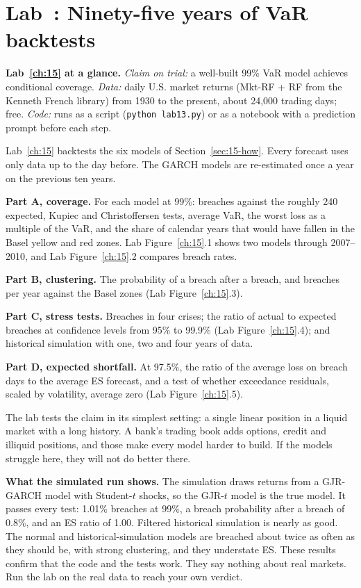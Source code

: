\section{Lab~\thechapter: Ninety-five years of VaR backtests}
\label{sec:15-lab}

\begin{callout}
\textbf{Lab~\ref{ch:15} at a glance.} \emph{Claim on trial:} a well-built 99\% VaR model achieves conditional coverage. \emph{Data:} daily U.S. market returns (Mkt-RF + RF from the Kenneth French library) from 1930 to the present, about 24,000 trading days; free. \emph{Code:} runs as a script (\texttt{python lab13.py}) or as a notebook with a prediction prompt before each step.
\end{callout}

Lab~\ref{ch:15} backtests the six models of Section~\ref{sec:15-how}. Every forecast uses only data up to the day before. The GARCH models are re-estimated once a year on the previous ten years.

\textbf{Part A, coverage.} For each model at 99\%: breaches against the roughly 240 expected, Kupiec and Christoffersen tests, average VaR, the worst loss as a multiple of the VaR, and the share of calendar years that would have fallen in the Basel yellow and red zones. Lab Figure~\ref{ch:15}.1 shows two models through 2007--2010, and Lab Figure~\ref{ch:15}.2 compares breach rates.

\textbf{Part B, clustering.} The probability of a breach after a breach, and breaches per year against the Basel zones (Lab Figure~\ref{ch:15}.3).

\textbf{Part C, stress tests.} Breaches in four crises; the ratio of actual to expected breaches at confidence levels from 95\% to 99.9\% (Lab Figure~\ref{ch:15}.4); and historical simulation with one, two and four years of data.

\textbf{Part D, expected shortfall.} At 97.5\%, the ratio of the average loss on breach days to the average ES forecast, and a test of whether exceedance residuals, scaled by volatility, average zero (Lab Figure~\ref{ch:15}.5).

The lab tests the claim in its simplest setting: a single linear position in a liquid market with a long history. A bank's trading book adds options, credit and illiquid positions, and those make every model harder to build. If the models struggle here, they will not do better there.

\textbf{What the simulated run shows.} The simulation draws returns from a GJR-GARCH model with Student-$t$ shocks, so the GJR-$t$ model is the true model. It passes every test: 1.01\% breaches at 99\%, a breach probability after a breach of 0.8\%, and an ES ratio of 1.00. Filtered historical simulation is nearly as good. The normal and historical-simulation models are breached about twice as often as they should be, with strong clustering, and they understate ES. These results confirm that the code and the tests work. They say nothing about real markets. Run the lab on the real data to reach your own verdict.

